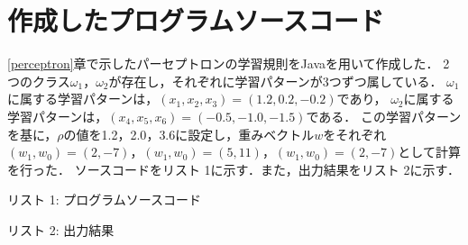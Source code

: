 \documentclass[a4paper]{jarticle}
\begin{document}

\newpage
\section{作成したプログラムソースコード}\label{program}
\ref{perceptron}章で示したパーセプトロンの学習規則をJavaを用いて作成した．
2つのクラス$\omega_1$，$\omega_2$が存在し，それぞれに学習パターンが3つずつ属している．
$\omega_1$に属する学習パターンは，$(x_1, x_2, x_3) = (1.2, 0.2, -0.2)$であり，
$\omega_2$に属する学習パターンは，$(x_4, x_5, x_6) = (-0.5, -1.0, -1.5)$である．
この学習パターンを基に，$\rho$の値を{1.2}，{2.0}，{3.6}に設定し，重みベクトル\mbox{\boldmath $w$}をそれぞれ$(w_1, w_0) = (2,-7)$，$(w_1, w_0) = (5,11)$，$(w_1, w_0) = (2,-7)$として計算を行った．
ソースコードをリスト 1に示す．また，出力結果をリスト 2に示す．


\vspace{3mm}
\begin{center}
リスト 1: プログラムソースコード
\begin{small}
\vspace{3mm}
\end{small}
\vspace{3mm}
\end{center}

\newpage
\begin{center}
リスト 2: 出力結果
\begin{small}
\vspace{3mm}
\begin{breakbox}
\end{breakbox}
\end{small}
\end{center}

\newpage
\end{document}
